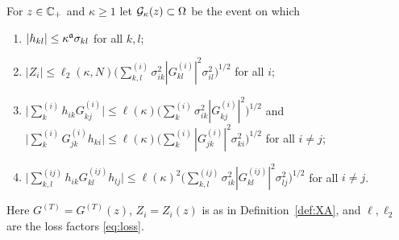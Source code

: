 \begin{definition}\label{def:good}
For $z\in\mathbb{C}_+$ and $\kappa\ge1$ let $\mathcal{G}_\kappa(z)\subset\Omega$ be the event on which
\begin{enumerate}[label=\textup{(G\arabic*)},leftmargin=2.8em,itemsep=0pt]
\item $|h_{kl}|\le\kappa^{\mathfrak{a}}\sigma_{kl}$ for all $k,l$;
\item $|Z_i|\le\ell_2(\kappa,N)\big(\sum^{(i)}_{k,l}\sigma_{ik}^2|G^{(i)}_{kl}|^2\sigma_{il}^2\big)^{1/2}$ for all $i$;
\item $\big|\sum^{(i)}_kh_{ik}G^{(i)}_{kj}\big|\le\ell(\kappa)\big(\sum^{(i)}_k\sigma_{ik}^2|G^{(i)}_{kj}|^2\big)^{1/2}$ and $\big|\sum^{(i)}_kG^{(i)}_{jk}h_{ki}\big|\le\ell(\kappa)\big(\sum^{(i)}_k|G^{(i)}_{jk}|^2\sigma_{ki}^2\big)^{1/2}$ for all $i\ne j$;
\item $\big|\sum^{(ij)}_{k,l}h_{ik}G^{(ij)}_{kl}h_{lj}\big|\le\ell(\kappa)^2\big(\sum^{(ij)}_{k,l}\sigma_{ik}^2|G^{(ij)}_{kl}|^2\sigma_{lj}^2\big)^{1/2}$ for all $i\ne j$.
\end{enumerate}
Here $G^{(T)}=G^{(T)}(z)$, $Z_i=Z_i(z)$ is as in Definition~\ref{def:XA}, and $\ell,\ell_2$ are the loss factors \eqref{eq:loss}.
\end{definition}

